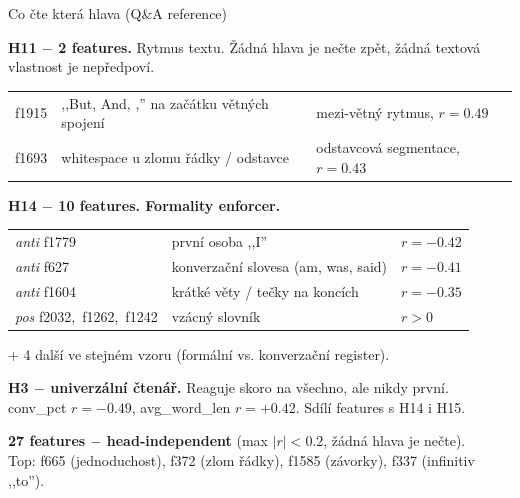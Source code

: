 \documentclass[aspectratio=169,10pt]{beamer}
\begin{document}
\begin{frame}[t]{Co čte která hlava (Q\&A reference)}
  \vspace{1mm}
  {\footnotesize
  \textbf{\color{accBlue}H11 $-$ 2 features.} Rytmus textu. Žádná hlava je nečte zpět, žádná textová vlastnost je nepředpoví.\\
  \begin{tabular}{@{}p{1.2cm}p{4.4cm}p{6cm}@{}}
    f1915 & ,,But, And, ,'' na začátku větných spojení & mezi-větný rytmus, $r = 0.49$ \\
    f1693 & whitespace u zlomu řádky / odstavce & odstavcová segmentace, $r = 0.43$ \\
  \end{tabular}\par\vspace{3mm}

  \textbf{\color{accRed}H14 $-$ 10 features. Formality enforcer.}\\
  \begin{tabular}{@{}p{2.6cm}p{5.5cm}p{3cm}@{}}
    \emph{anti} f1779 & první osoba ,,I'' & $r = -0.42$ \\
    \emph{anti} f627 & konverzační slovesa (am, was, said) & $r = -0.41$ \\
    \emph{anti} f1604 & krátké věty / tečky na koncích & $r = -0.35$ \\
    \emph{pos} f2032,~f1262,~f1242 & vzácný slovník & $r > 0$ \\
  \end{tabular}\par
  {\scriptsize\color{mutedText}+ 4 další ve stejném vzoru (formální vs. konverzační register).}\par\vspace{3mm}

  \textbf{\color{accGreen}H3 $-$ univerzální čtenář.} Reaguje skoro na všechno, ale nikdy první.\\
  conv\_pct $r = -0.49$, \quad avg\_word\_len $r = +0.42$. \quad Sdílí features s H14 i H15.\par\vspace{3mm}

  \textbf{27 features $-$ head-independent} (max $|r| < 0.2$, žádná hlava je nečte).\\
  Top: f665 (jednoduchost), f372 (zlom řádky), f1585 (závorky), f337 (infinitiv ,,to'').
  }
\end{frame}

\end{document}
